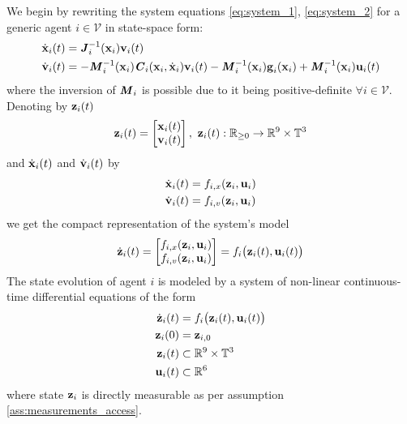 We begin by rewriting the system equations \eqref{eq:system_1},
\eqref{eq:system_2} for a generic agent $i \in \mathcal{V}$ in state-space form:
\begin{subequations}
\begin{align}
  \dot{\bm{\mathbf{x}}}_i(t) &= \bm{\mathit{J}}_i^{-1}(\bm{\mathbf{x}}_i) \bm{\mathbf{v}}_i(t) \\
  \dot{\bm{\mathbf{v}}}_i(t) &= -\bm{\mathit{M}}_i^{-1}(\bm{\mathbf{x}}_i)\bm{\mathit{C}}_i(\bm{\mathbf{x}}_i,\dot{\bm{\mathbf{x}}}_i) \bm{\mathbf{v}}_i(t)
    - \bm{\mathit{M}}_i^{-1}(\bm{\mathbf{x}}_i)\bm{\mathbf{g}}_i(\bm{\mathbf{x}}_i)
    + \bm{\mathit{M}}_i^{-1}(\bm{\mathbf{x}}_i)\bm{\mathbf{u}}_i(t)
\end{align}
\label{eq:state_space_system}
\end{subequations}
where the inversion of $\bm{\mathit{M}}_i$ is possible due to it being
positive-definite $\forall i \in \mathcal{V}$. Denoting by $\bm{\mathbf{z}}_i(t)$
\begin{align}
  \bm{\mathbf{z}}_i(t) =
    \begin{bmatrix}
      \bm{\mathbf{x}}_i(t) \\
      \bm{\mathbf{v}}_i(t) \\
    \end{bmatrix},\
    \bm{\mathbf{z}}_i(t) : \mathbb{R}_{\geq 0} \to \mathbb{R}^9 \times \mathbb{T}^3
\end{align}
and
$\dot{\bm{\mathbf{x}}}_i(t)$ and $\dot{\bm{\mathbf{v}}}_i(t)$ by
\begin{subequations}
\begin{align}
  \dot{\bm{\mathbf{x}}}_i(t) &= f_{i,x}(\bm{\mathbf{z}}_i, \bm{\mathbf{u}}_i) \\
  \dot{\bm{\mathbf{v}}}_i(t) &= f_{i,v}(\bm{\mathbf{z}}_i, \bm{\mathbf{u}}_i)
\end{align}
\end{subequations}
we get the compact representation of the system's model
\begin{align}
  \dot{\bm{\mathbf{z}}}_i(t) =
    \begin{bmatrix}
      f_{i,x}(\bm{\mathbf{z}}_i, \bm{\mathbf{u}}_i) \\
      f_{i,v}(\bm{\mathbf{z}}_i, \bm{\mathbf{u}}_i)
    \end{bmatrix} =
 f_i \big(\bm{\mathbf{z}}_i (t), \bm{\mathbf{u}}_i (t)\big)
\end{align}
The state evolution of agent $i$ is modeled by a system of non-linear
continuous-time differential equations of the form
\begin{align}
  \dot{\bm{\mathbf{z}}}_i(t) &= f_i \big(\bm{\mathbf{z}}_i (t), \bm{\mathbf{u}}_i (t)\big) \label{eq:non_perturbed_system}\\
  \bm{\mathbf{z}}_i(0) &= \bm{\mathbf{z}}_{i,0} \\
  \bm{\mathbf{z}}_i (t) & \subset \mathbb{R}^{9} \times \mathbb{T}^3 \\
  \bm{\mathbf{u}}_i (t) & \subset \mathbb{R}^6
  \label{eq:original_z_system}
\end{align}
where state $\bm{\mathbf{z}}_i$ is directly measurable as per assumption
\eqref{ass:measurements_access}.


